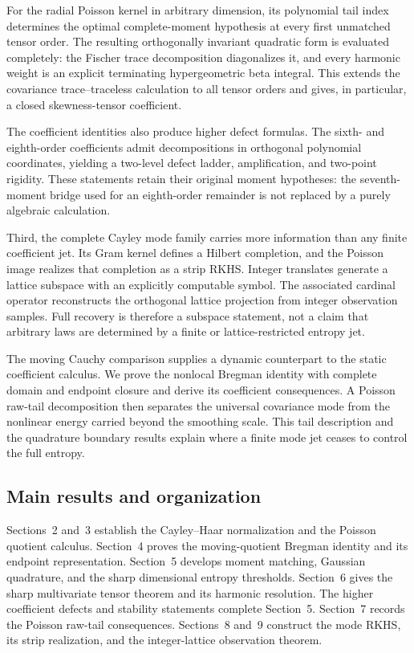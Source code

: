 For the radial Poisson kernel in arbitrary dimension, its polynomial tail
index determines the optimal complete-moment hypothesis at every first
unmatched tensor order.  The resulting orthogonally invariant quadratic
form is evaluated completely: the Fischer trace decomposition diagonalizes
it, and every harmonic weight is an explicit terminating hypergeometric
beta integral.  This extends the covariance trace--traceless calculation to
all tensor orders and gives, in particular, a closed skewness-tensor
coefficient.

The coefficient identities also produce higher defect formulas.  The sixth-
and eighth-order coefficients admit decompositions in orthogonal polynomial
coordinates, yielding a two-level defect ladder, amplification, and
two-point rigidity.  These statements retain their original moment
hypotheses: the seventh-moment bridge used for an eighth-order remainder is
not replaced by a purely algebraic calculation.

Third, the complete Cayley mode family carries more information than any
finite coefficient jet.  Its Gram kernel defines a Hilbert completion, and
the Poisson image realizes that completion as a strip RKHS.  Integer
translates generate a lattice subspace with an explicitly computable symbol.
The associated cardinal operator reconstructs the orthogonal lattice
projection from integer observation samples.  Full recovery is therefore a
subspace statement, not a claim that arbitrary laws are determined by a
finite or lattice-restricted entropy jet.

The moving Cauchy comparison supplies a dynamic counterpart to the static
coefficient calculus.  We prove the nonlocal Bregman identity with complete
domain and endpoint closure and derive its coefficient consequences.  A
Poisson raw-tail decomposition then separates the universal covariance mode
from the nonlinear energy carried beyond the smoothing scale.  This tail
description and the quadrature boundary results explain where a finite mode
jet ceases to control the full entropy.

\subsection*{Main results and organization}

Sections~2 and~3 establish the Cayley--Haar normalization and the Poisson
quotient calculus.  Section~4 proves the moving-quotient Bregman identity and
its endpoint representation.  Section~5 develops moment matching, Gaussian
quadrature, and the sharp dimensional entropy thresholds.  Section~6 gives
the sharp multivariate tensor theorem and its harmonic resolution.
The higher coefficient defects and stability statements complete
Section~5.  Section~7 records the Poisson raw-tail consequences.
Sections~8 and~9 construct the mode RKHS,
its strip realization, and the integer-lattice observation theorem.

